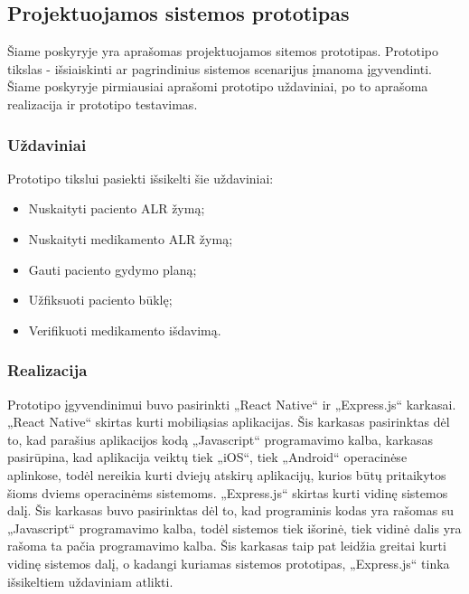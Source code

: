 \subsection{Projektuojamos sistemos prototipas}
Šiame poskyryje yra aprašomas projektuojamos sitemos prototipas. Prototipo tikslas - išsiaiskinti ar pagrindinius sistemos scenarijus įmanoma įgyvendinti. Šiame poskyryje pirmiausiai aprašomi prototipo uždaviniai, po to aprašoma realizacija ir prototipo testavimas.

\subsubsection{Uždaviniai}
Prototipo tikslui pasiekti išsikelti šie uždaviniai:

\begin{itemize}
    \item Nuskaityti paciento ALR žymą;
    \item Nuskaityti medikamento ALR žymą;
    \item Gauti paciento gydymo planą;
    \item Užfiksuoti paciento būklę;
    \item Verifikuoti medikamento išdavimą.
\end{itemize}

\subsubsection{Realizacija}
Prototipo įgyvendinimui buvo pasirinkti „React Native“ ir „Express.js“ karkasai. „React Native“ skirtas kurti mobiliąsias aplikacijas. Šis karkasas pasirinktas dėl to, kad parašius aplikacijos kodą „Javascript“ programavimo kalba, karkasas pasirūpina, kad aplikacija veiktų tiek „iOS“, tiek „Android“ operacinėse aplinkose, todėl nereikia kurti dviejų atskirų aplikacijų, kurios būtų pritaikytos šioms dviems operacinėms sistemoms. „Express.js“ skirtas kurti vidinę sistemos dalį. Šis karkasas buvo pasirinktas dėl to, kad programinis kodas yra rašomas su „Javascript“ programavimo kalba, todėl sistemos tiek išorinė, tiek vidinė dalis yra rašoma ta pačia programavimo kalba. Šis karkasas taip pat leidžia greitai kurti vidinę sistemos dalį, o kadangi kuriamas sistemos prototipas, „Express.js“ tinka išsikeltiem uždaviniam atlikti.


